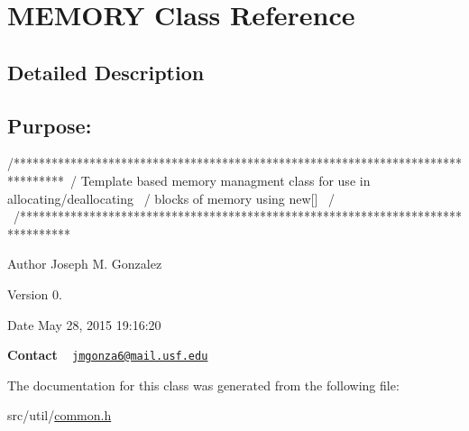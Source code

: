 \hypertarget{class_m_e_m_o_r_y}{}\section{M\+E\+M\+O\+R\+Y Class Reference}
\label{class_m_e_m_o_r_y}


\subsection{Detailed Description}
\subsection*{{\bfseries Purpose\+:} }

\begin{DoxyVerb}/********************************************************************************\
/  Template based memory managment class for use in allocating/deallocating      \
/  blocks of memory using new[]                                                  \
/                                                                                \
/********************************************************************************\
\end{DoxyVerb}


\begin{DoxyAuthor}{Author}
Joseph M. Gonzalez
\end{DoxyAuthor}
\begin{DoxyVersion}{Version}
0.
\end{DoxyVersion}
\begin{DoxyDate}{Date}
May 28, 2015 19\+:16\+:20
\end{DoxyDate}
{\bfseries Contact} ~\newline
 \href{mailto:jmgonza6@mail.usf.edu}{\tt jmgonza6@mail.\+usf.\+edu} 

The documentation for this class was generated from the following file\+:\begin{DoxyCompactItemize}
\item 
src/util/\hyperlink{common_8h}{common.\+h}\end{DoxyCompactItemize}
